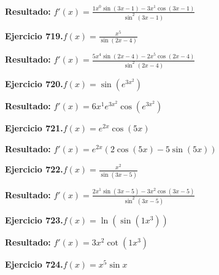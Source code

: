 \documentclass[10pt,a4paper]{article}
\begin{document}
\begin{solbox}
\textbf{Resultado:} \(\displaystyle f'(x) = \frac{1x^{0}\sin(3x -1) - 3x^{1}\cos(3x -1)}{\sin^2(3x -1)}\)
\end{solbox}

\begin{ejbox}
\textbf{Ejercicio 719.}\quad $f(x) = \frac{x^{5}}{\sin(2x -4)}$
\end{ejbox}

\begin{solbox}
\textbf{Resultado:} \(\displaystyle f'(x) = \frac{5x^{4}\sin(2x -4) - 2x^{5}\cos(2x -4)}{\sin^2(2x -4)}\)
\end{solbox}

\begin{ejbox}
\textbf{Ejercicio 720.}\quad $f(x) = \sin(e^{3x^{2}})$
\end{ejbox}

\begin{solbox}
\textbf{Resultado:} \(\displaystyle f'(x) = 6x^{1}e^{3x^{2}}\cos(e^{3x^{2}})\)
\end{solbox}

\newpage
\begin{ejbox}
\textbf{Ejercicio 721.}\quad $f(x) = e^{2x} \cos(5x)$
\end{ejbox}

\begin{solbox}
\textbf{Resultado:} \(\displaystyle f'(x) = e^{2x}(2\cos(5x) - 5\sin(5x))\)
\end{solbox}

\begin{ejbox}
\textbf{Ejercicio 722.}\quad $f(x) = \frac{x^{2}}{\sin(3x -5)}$
\end{ejbox}

\begin{solbox}
\textbf{Resultado:} \(\displaystyle f'(x) = \frac{2x^{1}\sin(3x -5) - 3x^{2}\cos(3x -5)}{\sin^2(3x -5)}\)
\end{solbox}

\begin{ejbox}
\textbf{Ejercicio 723.}\quad $f(x) = \ln(\sin(1x^{3}))$
\end{ejbox}

\begin{solbox}
\textbf{Resultado:} \(\displaystyle f'(x) = 3x^{2}\cot(1x^{3})\)
\end{solbox}

\newpage
\begin{ejbox}
\textbf{Ejercicio 724.}\quad $f(x) = x^{5} \sin x$
\end{ejbox}
\end{document}
